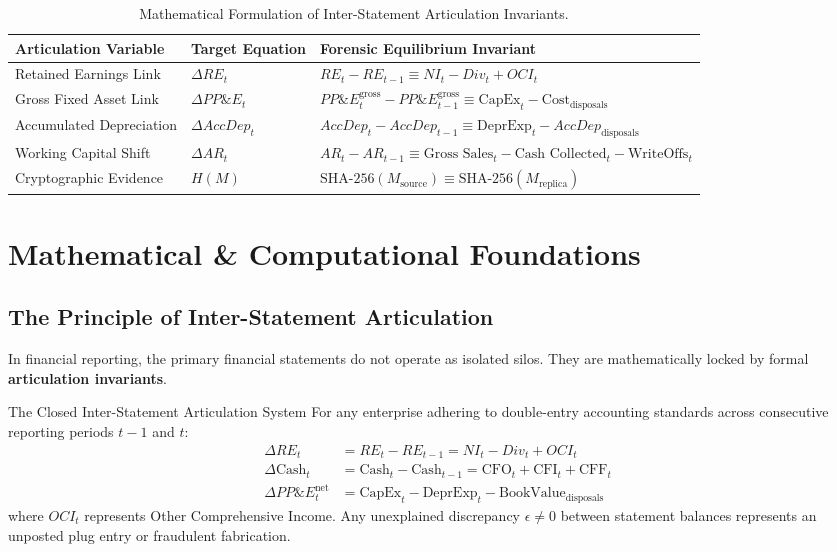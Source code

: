 \begin{table}[htbp]
\centering
\small
\begin{tabularx}{\textwidth}{llX}
\toprule
\textbf{Articulation Variable} & \textbf{Target Equation} & \textbf{Forensic Equilibrium Invariant} \\
\midrule
Retained Earnings Link & $\Delta RE_t$ & $RE_t - RE_{t-1} \equiv NI_t - Div_t + OCI_t$ \\
Gross Fixed Asset Link & $\Delta PP\&E_t$ & $PP\&E_t^{\text{gross}} - PP\&E_{t-1}^{\text{gross}} \equiv \text{CapEx}_t - \text{Cost}_{\text{disposals}}$ \\
Accumulated Depreciation & $\Delta AccDep_t$ & $AccDep_t - AccDep_{t-1} \equiv \text{DeprExp}_t - AccDep_{\text{disposals}}$ \\
Working Capital Shift & $\Delta AR_t$ & $AR_t - AR_{t-1} \equiv \text{Gross Sales}_t - \text{Cash Collected}_t - \text{WriteOffs}_t$ \\
Cryptographic Evidence & $H(M)$ & $\text{SHA-256}(M_{\text{source}}) \equiv \text{SHA-256}(M_{\text{replica}})$ \\
\bottomrule
\end{tabularx}
\caption{Mathematical Formulation of Inter-Statement Articulation Invariants.}
\label{tab:w4_notation}
\end{table}

\section{Mathematical \& Computational Foundations}

\subsection{The Principle of Inter-Statement Articulation}
In financial reporting, the primary financial statements do not operate as isolated silos. They are mathematically locked by formal \textbf{articulation invariants}.

\begin{theorembox}{The Closed Inter-Statement Articulation System}
For any enterprise adhering to double-entry accounting standards across consecutive reporting periods $t-1$ and $t$:
\begin{align}
\Delta RE_t &= RE_t - RE_{t-1} = NI_t - Div_t + OCI_t \label{eq:art_re} \\
\Delta \text{Cash}_t &= \text{Cash}_t - \text{Cash}_{t-1} = \text{CFO}_t + \text{CFI}_t + \text{CFF}_t \label{eq:art_cash} \\
\Delta PP\&E_t^{\text{net}} &= \text{CapEx}_t - \text{DeprExp}_t - \text{BookValue}_{\text{disposals}} \label{eq:art_ppe}
\end{align}
where $OCI_t$ represents Other Comprehensive Income. Any unexplained discrepancy $\epsilon \ne 0$ between statement balances represents an unposted plug entry or fraudulent fabrication.
\end{theorembox}

